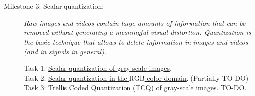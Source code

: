 \begin{description}
\item [Milestone 3: {\normalfont Scalar quantization:}] \emph{Raw images
and videos contain large amounts of information that can be removed
without generating a meaningful visual distortion. Quantization is the
basic technique that allows to delete information in images and videos
(and in signals in general)}.
  \begin{description}
  \item [Task 1: {\normalfont
      \href{https://sistemas-multimedia.github.io/contents/gray_SQ/}{Scalar
        quantization of gray-scale images}.}]
  \item [Task 2: {\normalfont
      \href{https://sistemas-multimedia.github.io/contents/RGB_SQ/}{Scalar
        quantization in the $\text{RGB}$ color domain}. (Partially TO-DO)}]
  \item [Task 3: {\normalfont
      \href{https://sistemas-multimedia.github.io/contents/gray_TCQ/}{Trellis
        Coded Quantization (TCQ) of gray-scale images}. TO-DO.}]
  \end{description}
  ~\newline
  

\end{description}
